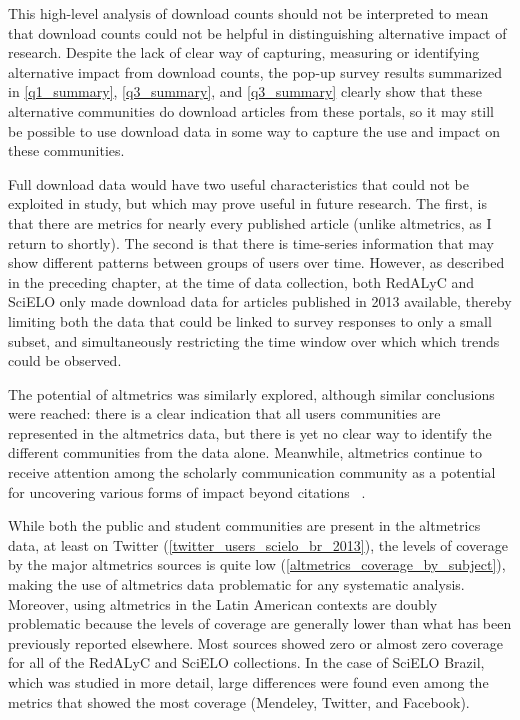 This high-level analysis of download counts should not be interpreted to mean that download counts could not be helpful in distinguishing alternative impact of research. Despite the lack of clear way of capturing, measuring or identifying alternative impact from download counts, the pop-up survey results summarized in \autoref{q1_summary}, \autoref{q3_summary}, and \autoref{q3_summary} clearly show that these alternative communities do download articles from these portals, so it may still be possible to use download data in some way to capture the use and impact on these communities.

Full download data would have two useful characteristics that could not be exploited in study, but which may prove useful in future research. The first, is that there are metrics for nearly every published article (unlike altmetrics, as I return to shortly). The second is that there is time-series information that may show different patterns between groups of users over time. However, as described in the preceding chapter, at the time of data collection, both RedALyC and SciELO only made download data for articles published in 2013 available, thereby limiting both the data that could be linked to survey responses to only a small subset, and simultaneously restricting the time window over which which trends could be observed.

The potential of altmetrics was similarly explored, although similar conclusions were reached: there is a clear indication that all users communities are represented in the altmetrics data, but there is yet no clear way to identify the different communities from the data alone. Meanwhile, altmetrics continue to receive attention among the scholarly communication community as a potential for uncovering various forms of impact beyond citations ~\citep{Torres-Salinas2013,Costas2014,Haustein2013,Eysenbach2011,Bollen2008a,Bollen2009}.

While both the public and student communities are present in the altmetrics data, at least on Twitter (\autoref{twitter_users_scielo_br_2013}), the levels of coverage by the major altmetrics sources is quite low (\autoref{altmetrics_coverage_by_subject}), making the use of altmetrics data problematic for any systematic analysis. Moreover, using altmetrics in the Latin American contexts are doubly problematic because the levels of coverage are generally lower than what has been previously reported elsewhere. Most sources showed zero or almost zero coverage for all of the RedALyC and SciELO collections. In the case of SciELO Brazil, which was studied in more detail, large differences were found even among the metrics that showed the most coverage (Mendeley, Twitter, and Facebook).

